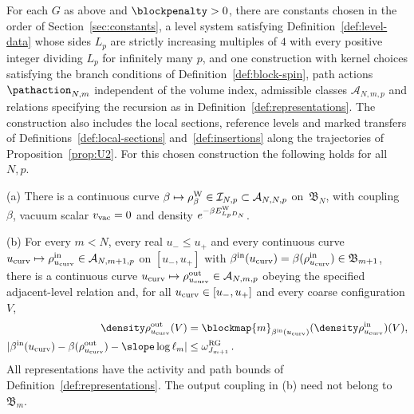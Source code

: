 \begin{proposition}\label{prop:U1}
For each $G$ as above and $\blockpenalty>0$, there are constants chosen in the order of Section~\ref{sec:constants}, a level system satisfying Definition~\ref{def:level-data} whose sides $L_p$ are strictly increasing multiples of $4$ with every positive integer dividing $L_p$ for infinitely many $p$, and one construction with kernel choices satisfying the branch conditions of Definition~\ref{def:block-spin}, path actions $\pathaction_{N,m}$ independent of the volume index, admissible classes $\mathcal A_{N,m,p}$ and relations specifying the recursion as in Definition~\ref{def:representations}. The construction also includes the local sections, reference levels and marked transfers of Definitions~\ref{def:local-sections} and~\ref{def:insertions} along the trajectories of Proposition~\ref{prop:U2}. For this chosen construction the following holds for all $N,p$.

(a) There is a continuous curve $\beta\mapsto\rho^{\rm W}_\beta\in\mathcal I_{N,p}\subset\mathcal A_{N,N,p}$ on~$\mathfrak B_N$, with coupling $\beta$, vacuum scalar $v_{\rm vac}=0$ and density $e^{-\beta E^{\rm W}_{L_pD_N}}$.

(b) For every $m<N$, every real $u_-\le u_+$ and every continuous curve $u_{\rm curv}\mapsto\rho^{\rm in}_{u_{\rm curv}}\in\mathcal A_{N,m+1,p}$ on $[u_-,u_+]$ with $\beta^{\rm in}(u_{\rm curv})=\beta(\rho^{\rm in}_{u_{\rm curv}})\in\mathfrak B_{m+1}$, there is a continuous curve $u_{\rm curv}\mapsto\rho^{\rm out}_{u_{\rm curv}}\in\mathcal A_{N,m,p}$ obeying the specified adjacent-level relation and, for all $u_{\rm curv}\in[u_-,u_+]$ and every coarse configuration $V$,
\begin{equation}\label{eq:U1-1}
\begin{aligned}
\density\rho^{\rm out}_{u_{\rm curv}}(V)
&=\blockmap{m}_{\beta^{\rm in}(u_{\rm curv})}(\density\rho^{\rm in}_{u_{\rm curv}})(V),\\
|\beta^{\rm in}(u_{\rm curv})-\beta(\rho^{\rm out}_{u_{\rm curv}})-\slope\log\ell_m|
&\le\omega^{\rm RG}_{J_{m+1}}\,.
\end{aligned}
\end{equation}
All representations have the activity and path bounds of Definition~\ref{def:representations}. The output coupling in (b) need not belong to $\mathfrak B_m$.


\end{proposition}
